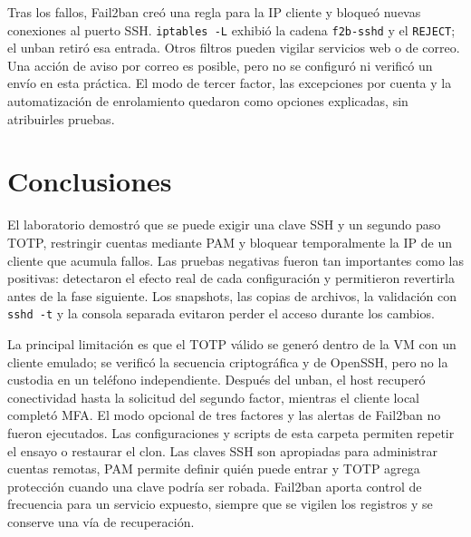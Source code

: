 \documentclass[11pt,a4paper]{article}
\begin{document}
Tras los fallos, Fail2ban creó una regla para la IP cliente y bloqueó nuevas
conexiones al puerto SSH. \texttt{iptables -L} exhibió la cadena
\texttt{f2b-sshd} y el \texttt{REJECT}; el unban retiró esa entrada. Otros
filtros pueden vigilar servicios web o de correo. Una acción de aviso por
correo es posible, pero no se configuró ni verificó un envío en esta práctica.
El modo de tercer factor, las excepciones por cuenta y la automatización de
enrolamiento quedaron como opciones explicadas, sin atribuirles pruebas.

\section{Conclusiones}
El laboratorio demostró que se puede exigir una clave SSH y un segundo paso
TOTP, restringir cuentas mediante PAM y bloquear temporalmente la IP de un
cliente que acumula fallos. Las pruebas negativas fueron tan importantes como
las positivas: detectaron el efecto real de cada configuración y permitieron
revertirla antes de la fase siguiente. Los snapshots, las copias de archivos,
la validación con \texttt{sshd -t} y la consola separada evitaron perder el
acceso durante los cambios.

La principal limitación es que el TOTP válido se generó dentro de la VM con un
cliente emulado; se verificó la secuencia criptográfica y de OpenSSH, pero no
la custodia en un teléfono independiente. Después del unban, el host recuperó
conectividad hasta la solicitud del segundo factor, mientras el cliente local
completó MFA. El modo opcional de tres factores y las alertas de Fail2ban no
fueron ejecutados. Las configuraciones y scripts de esta carpeta permiten
repetir el ensayo o restaurar el clon.
Las claves SSH son apropiadas para administrar cuentas remotas, PAM permite
definir quién puede entrar y TOTP agrega protección cuando una clave podría
ser robada. Fail2ban aporta control de frecuencia para un servicio expuesto,
siempre que se vigilen los registros y se conserve una vía de recuperación.

\clearpage
\end{document}
